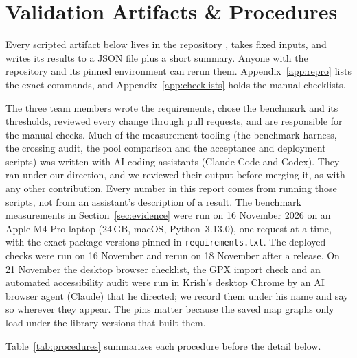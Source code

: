 \section{Validation Artifacts \& Procedures}

Every scripted artifact below lives in the repository \citep{runline2026repo},
takes fixed inputs, and writes its results to a JSON file plus a short
summary. Anyone with the repository and its pinned environment can rerun
them. Appendix~\ref{app:repro} lists the exact commands, and
Appendix~\ref{app:checklists} holds the manual checklists.

The three team members wrote the requirements, chose the benchmark and its
thresholds, reviewed every change through pull requests, and are responsible
for the manual checks. Much of the measurement tooling (the benchmark
harness, the crossing audit, the pool comparison and the acceptance and
deployment scripts) was written with AI coding assistants (Claude Code and
Codex). They ran under our direction, and we reviewed their output before
merging it, as with any other contribution. Every number in this report comes
from running those scripts, not from an assistant's description of a result.
The benchmark measurements in Section~\ref{sec:evidence} were run on
16 November 2026 on an Apple M4 Pro laptop (24\,GB, macOS, Python~3.13.0),
one request at a time, with the exact package versions pinned in
\texttt{requirements.txt}. The deployed checks were run on 16 November and
rerun on 18 November after a release. On 21 November the desktop browser
checklist, the GPX import check and an automated accessibility audit were run
in Krish's desktop Chrome by an AI browser agent (Claude) that he directed;
we record them under his name and say so wherever they appear. The pins matter because the saved map
graphs only load under the library versions that built them.

Table~\ref{tab:procedures} summarizes each procedure before the detail below.

